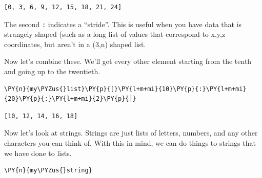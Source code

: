             \begin{tcolorbox}[breakable, size=fbox, boxrule=.5pt, pad at break*=1mm, opacityfill=0]
\begin{Verbatim}[commandchars=\\\{\}]
[0, 3, 6, 9, 12, 15, 18, 21, 24]
\end{Verbatim}
\end{tcolorbox}
        
    The second \texttt{:} indicates a ``stride''. This is useful when you
have data that is strangely shaped (such as a long list of values that
correspond to x,y,z coordinates, but aren't in a (3,n) shaped list.

Now let's combine these. We'll get every other element starting from the
tenth and going up to the twentieth.

    \begin{tcolorbox}[breakable, size=fbox, boxrule=1pt, pad at break*=1mm,colback=cellbackground, colframe=cellborder]
\begin{Verbatim}[commandchars=\\\{\}]
\PY{n}{my\PYZus{}list}\PY{p}{[}\PY{l+m+mi}{10}\PY{p}{:}\PY{l+m+mi}{20}\PY{p}{:}\PY{l+m+mi}{2}\PY{p}{]}
\end{Verbatim}
\end{tcolorbox}

            \begin{tcolorbox}[breakable, size=fbox, boxrule=.5pt, pad at break*=1mm, opacityfill=0]
\begin{Verbatim}[commandchars=\\\{\}]
[10, 12, 14, 16, 18]
\end{Verbatim}
\end{tcolorbox}
        
    Now let's look at strings. Strings are just lists of letters, numbers,
and any other characters you can think of. With this in mind, we can do
things to strings that we have done to lists.

    \begin{tcolorbox}[breakable, size=fbox, boxrule=1pt, pad at break*=1mm,colback=cellbackground, colframe=cellborder]
\begin{Verbatim}[commandchars=\\\{\}]
\PY{n}{my\PYZus{}string}
\end{Verbatim}
\end{tcolorbox}

